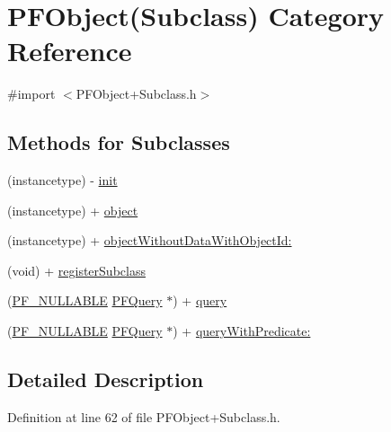 \hypertarget{category_p_f_object_07_subclass_08}{}\section{P\+F\+Object(Subclass) Category Reference}
\label{category_p_f_object_07_subclass_08}


{\ttfamily \#import $<$P\+F\+Object+\+Subclass.\+h$>$}

\subsection*{Methods for Subclasses}
\label{_amgrp4855bbbf49c1c72434fd4c207435763a}%


 

 \begin{DoxyCompactItemize}
\item 
(instancetype) -\/ \hyperlink{category_p_f_object_07_subclass_08_a174f279ef1d936f8b9d3ffad226c0a6b}{init}
\item 
(instancetype) + \hyperlink{category_p_f_object_07_subclass_08_a04d543b41a02f273bbf2dde644e5e0ef}{object}
\item 
(instancetype) + \hyperlink{category_p_f_object_07_subclass_08_afb4e4b2170ba91ae798f94833c6686bb}{object\+Without\+Data\+With\+Object\+Id\+:}
\item 
(void) + \hyperlink{category_p_f_object_07_subclass_08_a44be6ed21a7d2807fe8c0e420a3ea736}{register\+Subclass}
\item 
(\hyperlink{_p_f_nullability_8h_a528d97a96c5fb279a45c378f5657fca2}{P\+F\+\_\+\+N\+U\+L\+L\+A\+B\+L\+E} \hyperlink{interface_p_f_query}{P\+F\+Query} $\ast$) + \hyperlink{category_p_f_object_07_subclass_08_a13571072ecdde530ba4a0c2c90e451f1}{query}
\item 
(\hyperlink{_p_f_nullability_8h_a528d97a96c5fb279a45c378f5657fca2}{P\+F\+\_\+\+N\+U\+L\+L\+A\+B\+L\+E} \hyperlink{interface_p_f_query}{P\+F\+Query} $\ast$) + \hyperlink{category_p_f_object_07_subclass_08_ac982b71a43cc2a36f37b9e71115b2daa}{query\+With\+Predicate\+:}
\end{DoxyCompactItemize}


\subsection{Detailed Description}


Definition at line 62 of file P\+F\+Object+\+Subclass.\+h.



